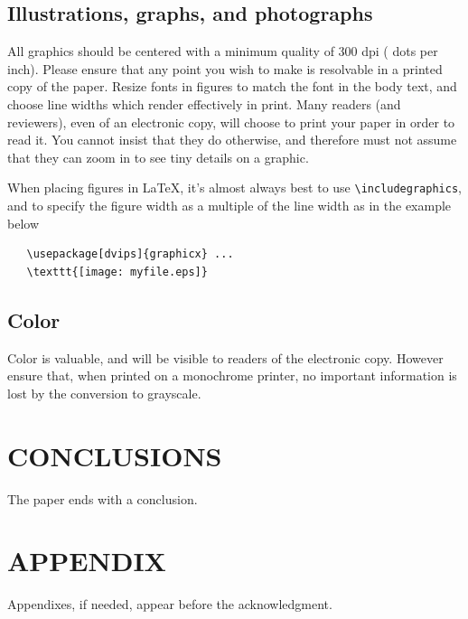 {%
\subsection{Illustrations, graphs, and photographs}

All graphics should be centered with a minimum quality of 300 dpi ( dots per inch).  Please ensure that any point you wish to make is resolvable in a printed copy of the paper.  Resize fonts in figures to match the font in the body text, and choose line widths which render effectively in print.  Many readers (and reviewers), even of an electronic copy, will choose to print your paper in order to read it.  You cannot insist that they do otherwise, and therefore must not assume that they can zoom in to see tiny details on a graphic.

When placing figures in \LaTeX, it's almost always best to use \verb+\includegraphics+, and to specify the  figure width as a multiple of the line width as in the example below
{\small\begin{verbatim}
   \usepackage[dvips]{graphicx} ...
   \texttt{[image: myfile.eps]}
\end{verbatim}
}

\subsection{Color}

Color is valuable, and will be visible to readers of the electronic copy.
However ensure that, when printed on a monochrome printer, no important
information is lost by the conversion to grayscale.

\section{CONCLUSIONS}

The paper ends with a conclusion.



\section*{APPENDIX}

Appendixes, if needed, appear before the acknowledgment.



}
